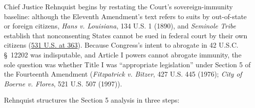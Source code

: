 \documentclass[12pt]{article}
\begin{document}
Chief Justice Rehnquist begins by restating the Court's sovereign-immunity baseline: although the Eleventh Amendment's text refers to suits by out-of-state or foreign citizens, \textit{Hans v. Louisiana}, 134 U.S. 1 (1890), and \textit{Seminole Tribe} establish that nonconsenting States cannot be sued in federal court by their own citizens (\href{https://supreme.justia.com/cases/federal/us/531/356/}{531 U.S. at 363}). Because Congress's intent to abrogate in 42 U.S.C. \S~12202 was indisputable, and Article I powers cannot abrogate immunity, the sole question was whether Title I was ``appropriate legislation'' under Section 5 of the Fourteenth Amendment (\textit{Fitzpatrick v. Bitzer}, 427 U.S. 445 (1976); \textit{City of Boerne v. Flores}, 521 U.S. 507 (1997)).

Rehnquist structures the Section 5 analysis in three steps:
\end{document}
